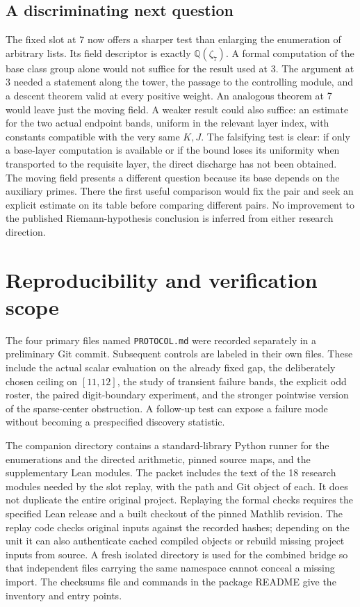 \documentclass[12pt,letterpaper]{article}
\begin{document}
\subsection{A discriminating next question}
The fixed slot at 7 now offers a sharper test than enlarging the enumeration of arbitrary lists. Its field descriptor is exactly \(\mathbb Q(\zeta_7)\). A formal computation of the base class group alone would not suffice for the result used at 3. The argument at 3 needed a statement along the tower, the passage to the controlling module, and a descent theorem valid at every positive weight. An analogous theorem at 7 would leave just the moving field. A weaker result could also suffice: an estimate for the two actual endpoint bands, uniform in the relevant layer index, with constants compatible with the very same \(K,J\). The falsifying test is clear: if only a base-layer computation is available or if the bound loses its uniformity when transported to the requisite layer, the direct discharge has not been obtained. The moving field presents a different question because its base depends on the auxiliary primes. There the first useful comparison would fix the pair and seek an explicit estimate on its table before comparing different pairs. No improvement to the published Riemann-hypothesis conclusion is inferred from either research direction.

\section{Reproducibility and verification scope}
The four primary files named \texttt{PROTOCOL.md} were recorded separately in a preliminary Git commit. Subsequent controls are labeled in their own files. These include the actual scalar evaluation on the already fixed gap, the deliberately chosen ceiling on \([11,12]\), the study of transient failure bands, the explicit odd roster, the paired digit-boundary experiment, and the stronger pointwise version of the sparse-center obstruction. A follow-up test can expose a failure mode without becoming a prespecified discovery statistic.

The companion directory contains a standard-library Python runner for the enumerations and the directed arithmetic, pinned source maps, and the supplementary Lean modules. The packet includes the text of the 18 research modules needed by the slot replay, with the path and Git object of each. It does not duplicate the entire original project. Replaying the formal checks requires the specified Lean release and a built checkout of the pinned Mathlib revision. The replay code checks original inputs against the recorded hashes; depending on the unit it can also authenticate cached compiled objects or rebuild missing project inputs from source. A fresh isolated directory is used for the combined bridge so that independent files carrying the same namespace cannot conceal a missing import. The checksums file and commands in the package README give the inventory and entry points.
\end{document}

